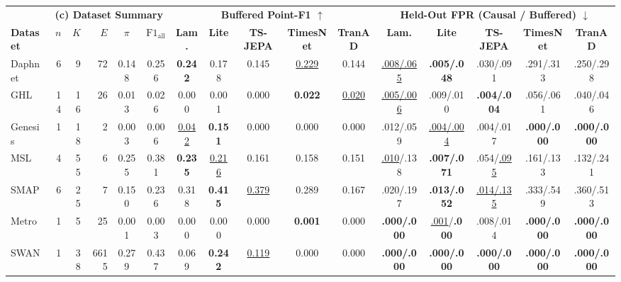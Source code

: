 \begin{table}[!t]
\vspace{1.5pt}
\setlength{\tabcolsep}{2.2pt}
\begin{tabular*}{\textwidth}{@{\extracolsep{\fill}}l rrr cc ccccc ccccc@{}}
\toprule
& \multicolumn{5}{c}{\textbf{(c) Dataset Summary}} & \multicolumn{5}{c}{\textbf{Buffered Point-F1 $\uparrow$}} & \multicolumn{5}{c}{\textbf{Held-Out FPR (Causal / Buffered) $\downarrow$}} \\
\cmidrule(lr){2-6} \cmidrule(lr){7-11} \cmidrule(lr){12-16}
\textbf{Dataset} & {$n$} & {$K$} & {$E$} & {$\pi$} & {$\text{F1}_{\text{all}}$} & {\textbf{Lam.}} & {\textbf{Lite}} & {\textbf{TS-JEPA}} & {\textbf{TimesNet}} & {\textbf{TranAD}} & {\textbf{Lam.}} & {\textbf{Lite}} & {\textbf{TS-JEPA}} & {\textbf{TimesNet}} & {\textbf{TranAD}} \\
\midrule
Daphnet & 6  & 9  & 72   & 0.148 & 0.256 & \textbf{0.242}    & 0.178             & 0.145             & \underline{0.229} & 0.144             & \underline{.008/.065} & \textbf{.005/.048}    & .030/.091             & .291/.313          & .250/.298 \\
GHL     & 14 & 16 & 26   & 0.013 & 0.026 & 0.000             & 0.001             & 0.000             & \textbf{0.022}    & \underline{0.020} & \underline{.005/.006} & .009/.010             & \textbf{.004/.004}    & .056/.061          & .040/.046 \\
Genesis & 1  & 18 & 2    & 0.003 & 0.006 & \underline{0.042} & \textbf{0.151}    & 0.000             & 0.000             & 0.000             & .012/.059             & \underline{.004/.004} & .004/.017             & \textbf{.000/.000} & \textbf{.000/.000} \\
MSL     & 4  & 55 & 6    & 0.255 & 0.381 & \textbf{0.235}    & \underline{0.216} & 0.161             & 0.158             & 0.151             & \underline{.010}/.138 & \textbf{.007/.071}    & .054/\underline{.095} & .161/.133          & .132/.241 \\
SMAP    & 6  & 25 & 7    & 0.150 & 0.236 & 0.318             & \textbf{0.415}    & \underline{0.379} & 0.289             & 0.167             & .020/.197             & \textbf{.013/.052}    & \underline{.014/.135} & .333/.549          & .360/.513 \\
Metro   & 1  & 5  & 25   & 0.001 & 0.003 & 0.000             & 0.000             & 0.000             & \textbf{0.001}    & 0.000             & \textbf{.000/.000}    & \underline{.001}/\textbf{.000} & .008/.014             & \textbf{.000/.000} & \textbf{.000/.000} \\
SWAN    & 1  & 38 & 6615 & 0.279 & 0.437 & 0.069             & \textbf{0.242}    & \underline{0.119} & 0.000             & 0.000             & \textbf{.000/.000}    & \textbf{.000/.000}    & \textbf{.000/.000}    & \textbf{.000/.000} & \textbf{.000/.000} \\

\end{tabular*}
\end{table}
